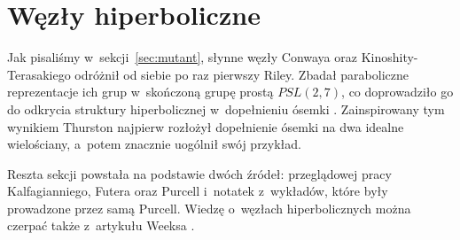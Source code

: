 

\section{Węzły hiperboliczne}
%
\label{sec:hyperbolic}%
Jak pisaliśmy w~sekcji~\ref{sec:mutant}, słynne węzły Conwaya oraz Kinoshity-Terasakiego odróżnił od siebie po raz pierwszy Riley.
%
%
%
Zbadał paraboliczne reprezentacje ich grup w~skończoną grupę prostą $PSL(2, 7)$, co doprowadziło go do odkrycia struktury hiperbolicznej w~dopełnieniu ósemki \cite{riley75}.
%
Zainspirowany tym wynikiem Thurston najpierw rozłożył dopełnienie ósemki na dwa idealne wielościany, a~potem znacznie uogólnił swój przykład.

Reszta sekcji powstała na podstawie dwóch źródeł: przeglądowej pracy Kalfagianniego, Futera oraz Purcell \cite{purcell19} i~notatek z~wykładów, które były prowadzone przez samą Purcell.
%
%
%
Wiedzę o~węzłach hiperbolicznych można czerpać także z~artykułu Weeksa \cite{weeks05}.
%








